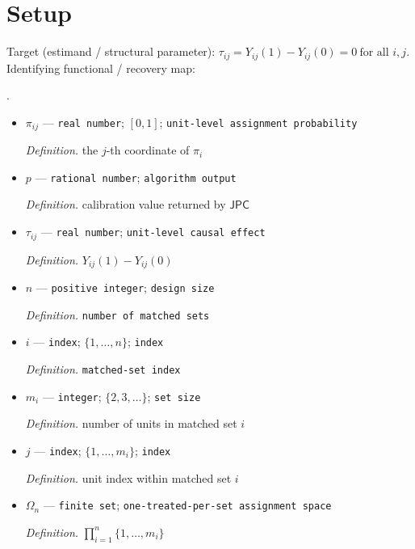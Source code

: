 \documentclass{article}
\begin{document}
\section{Setup}

Target (estimand / structural parameter): \(\tau_{ij}=Y_{ij}(1)-Y_{ij}(0)=0\ \text{for all }i,j\).
Identifying functional / recovery map: \par\noindent {}\par\noindent.
\begin{itemize}
  \item \(\pi_{ij}\) --- \texttt{real number}; \([0,1]\); \texttt{unit-\allowbreak{}level assignment probability}
  \par\smallskip\noindent\emph{Definition.} the \(j\)-th coordinate of \(\pi_i\)
  \item \(p\) --- \texttt{rational number}; \texttt{algorithm output}
  \par\smallskip\noindent\emph{Definition.} calibration value returned by \(\mathsf{JPC}\)
  \item \(\tau_{ij}\) --- \texttt{real number}; \texttt{unit-\allowbreak{}level causal effect}
  \par\smallskip\noindent\emph{Definition.} \(Y_{ij}(1)-Y_{ij}(0)\)
  \item \(n\) --- \texttt{positive integer}; \texttt{design size}
  \par\smallskip\noindent\emph{Definition.} \texttt{number of matched sets}
  \item \(i\) --- \texttt{index}; \(\{1,\ldots,n\}\); \texttt{index}
  \par\smallskip\noindent\emph{Definition.} \texttt{matched-\allowbreak{}set index}
  \item \(m_i\) --- \texttt{integer}; \(\{2,3,\ldots\}\); \texttt{set size}
  \par\smallskip\noindent\emph{Definition.} number of units in matched set \(i\)
  \item \(j\) --- \texttt{index}; \(\{1,\ldots,m_i\}\); \texttt{index}
  \par\smallskip\noindent\emph{Definition.} unit index within matched set \(i\)
  \item \(\Omega_n\) --- \texttt{finite set}; \texttt{one-\allowbreak{}treated-\allowbreak{}per-\allowbreak{}set assignment space}
  \par\smallskip\noindent\emph{Definition.} \(\prod_{i=1}^n\{1,\ldots,m_i\}\)

\end{itemize}
\end{document}
